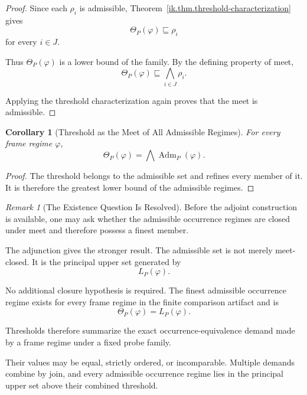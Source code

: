 \documentclass[11pt]{article}
\theoremstyle{plain}
\newtheorem{corollary}[theorem]{Corollary}
\theoremstyle{definition}
\theoremstyle{remark}
\newtheorem{remark}[theorem]{Remark}
\begin{document}
\begin{proof}
  Since each \(\rho_i\) is admissible,
  Theorem~\ref{ik.thm.threshold-characterization}
  gives
  \[
    \Theta_P(\varphi)
    \sqsubseteq
    \rho_i
  \]
  for every \(i\in J\).

  Thus \(\Theta_P(\varphi)\)
  is a lower bound of the family.
  By the defining property of meet,
  \[
    \Theta_P(\varphi)
    \sqsubseteq
    \bigwedge_{i\in J}
    \rho_i.
  \]

  Applying the threshold characterization again
  proves that the meet is admissible.
\end{proof}

\begin{corollary}[Threshold as the Meet of All Admissible Regimes]
  \label{ik.cor.threshold-meet}
  For every frame regime \(\varphi\),
  \[
    \Theta_P(\varphi)
    =
    \bigwedge
    \operatorname{Adm}_P(\varphi).
  \]
\end{corollary}

\begin{proof}
  The threshold belongs to the admissible set
  and refines every member of it.
  It is therefore the greatest lower bound
  of the admissible regimes.
\end{proof}

\begin{remark}[The Existence Question Is Resolved]
  \label{ik.rem.threshold-existence}
  Before the adjoint construction is available,
  one may ask whether the admissible occurrence regimes
  are closed under meet
  and therefore possess a finest member.

  The adjunction gives the stronger result.
  The admissible set is not merely meet-closed.
  It is the principal upper set
  generated by
  \[
    L_P(\varphi).
  \]

  No additional closure hypothesis is required.
  The finest admissible occurrence regime
  exists for every frame regime
  in the finite comparison artifact
  and is
  \[
    \Theta_P(\varphi)
    =
    L_P(\varphi).
  \]
\end{remark}

Thresholds therefore summarize
the exact occurrence-equivalence demand
made by a frame regime under a fixed probe family.

Their values may be equal,
strictly ordered,
or incomparable.
Multiple demands combine by join,
and every admissible occurrence regime
lies in the principal upper set
above their combined threshold.
\end{document}
